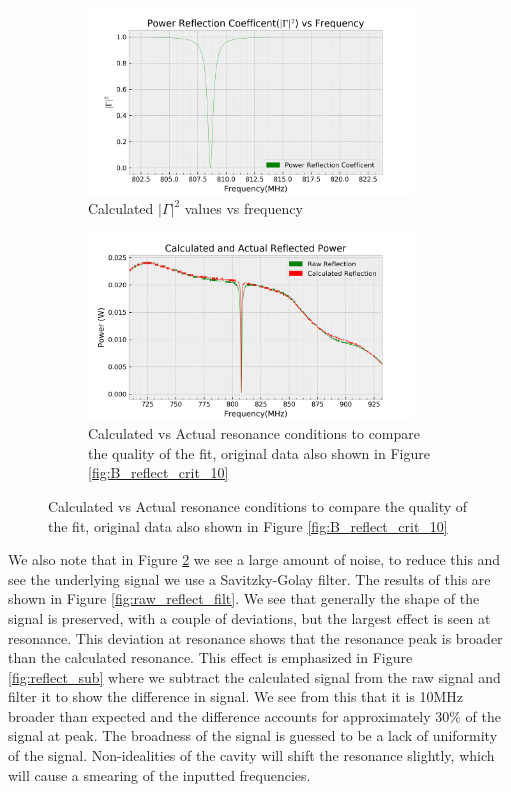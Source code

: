 \begin{figure}[h!]
\centering
\begin{subfigure}[t]{.475\textwidth}
  \centering
  \includegraphics[width=0.95\textwidth]{figures/PartB/gamma.png}
  \caption{Calculated $|\Gamma|^2$ values vs frequency}
 \label{fig:gamma}
\end{subfigure}\hfill
\begin{subfigure}[t]{.475\textwidth}
  \centering
  \includegraphics[width=0.95\textwidth]{figures/PartB/reflect_raw.png}
  \caption{Calculated vs Actual resonance conditions to compare the quality of the fit, original data also shown in Figure \ref{fig:B_reflect_crit_10}}
\label{fig:raw_reflect_calc}
\end{subfigure}
\label{fig:gamma}
\end{figure}

We also note that in Figure \ref{fig:raw_reflect_calc} we see a large amount of noise, to reduce this and see the underlying signal we use a Savitzky-Golay filter. The results of this are shown in Figure \ref{fig:raw_reflect_filt}. We see that generally the shape of the signal is preserved, with a couple of deviations, but the largest effect is seen at resonance. This deviation at resonance shows that the resonance peak is broader than the calculated resonance. This effect is emphasized in Figure \ref{fig:reflect_sub} where we subtract the calculated signal from the raw signal and filter it to show the difference in signal. We see from this that it is 10MHz broader than expected and the difference accounts for approximately 30\% of the signal at peak. The broadness of the signal is guessed to be a lack of uniformity of the signal. Non-idealities of the cavity will shift the resonance slightly, which will cause a smearing of the inputted frequencies.

